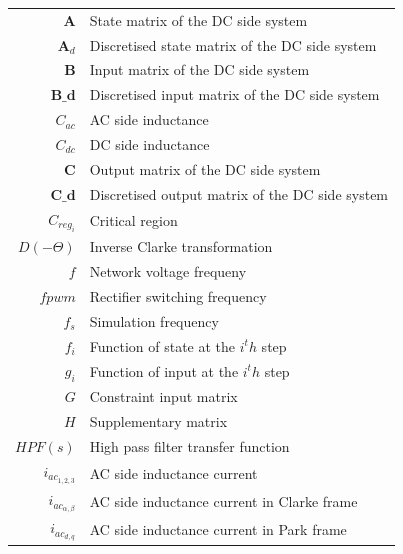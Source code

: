   \begin{scriptsize}
\begin{tabularx}{\textwidth}{r|X}
  $\textbf{A}$                  & State matrix of the DC side system\\
  $\textbf{A}_d$                & Discretised state matrix of the DC side system\\
  $\textbf{B}$                  & Input matrix of the DC side system\\
  $\textbf{B_d}$                & Discretised input matrix of the DC side system\\
  $C_{ac}$                          & AC side inductance\\
  $C_{dc}$                          & DC side inductance\\
  $\textbf{C}$                  & Output matrix of the DC side system\\
  $\textbf{C_d}$                & Discretised output matrix of the DC side system\\
  $C_{reg_i}$                       & Critical region\\
  $D(-\Theta)$                      & Inverse Clarke transformation\\
  $f$                               & Network voltage frequeny\\
  $fpwm$                            & Rectifier switching frequency\\
  $f_s$                             & Simulation frequency\\
  $f_i$                             & Function of state at the $i^th$ step\\
  $g_i$                             & Function of input at the $i^th$ step\\
  $G$                               & Constraint input matrix\\
  $H$                               & Supplementary matrix\\
  $HPF(s)$                          & High pass filter transfer function\\
  $i_{ac_{1,2,3}}$                  & AC side inductance current\\
  $i_{ac_{\alpha,\beta}}$           & AC side inductance current in Clarke frame\\
  $i_{ac_{d,q}}$                    & AC side inductance current in Park frame\\

\end{tabularx}
\end{scriptsize}
